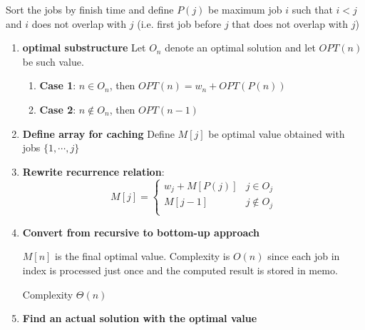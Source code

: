 \documentclass[11pt]{article}
\begin{document}
\begin{solution}

  Sort the jobs by finish time and define $P(j)$ be maximum job $i$ such that $i < j$ and $i$ does not overlap with $j$ (i.e. first job before $j$ that does not overlap with $j$)
  \begin{enumerate}
    \item \textbf{optimal substructure} Let $O_n$ denote an optimal solution and let $OPT(n)$ be such value.
    \begin{enumerate}
      \item \textbf{Case 1}: $n\in O_n$, then $OPT(n) = w_n + OPT(P(n))$
      \item \textbf{Case 2}: $n\not\in O_n$, then $OPT(n-1)$
    \end{enumerate}
    \item \textbf{Define array for caching} Define $M[j]$ be optimal value obtained with jobs $\{ 1 , \cdots, j \}$
    \item \textbf{Rewrite recurrence relation}:
    \[
      M[j] =
      \begin{cases}
        w_j + M[P(j)] & j \in O_j \\
        M[j-1] & j\not\in O_j \\
      \end{cases}
    \]
    \item \textbf{Convert from recursive to bottom-up approach}

    \begin{algorithm}[H]
     \end{algorithm}
     $M[n]$ is the final optimal value. Complexity is $O(n)$ since each job in index is processed just once and the computed result is stored in memo.\\

     \begin{algorithm}[H]
      \end{algorithm}
      Complexity $\Theta(n)$
      \item \textbf{Find an actual solution with the optimal value}


\end{enumerate}
\end{solution}
\end{document}
